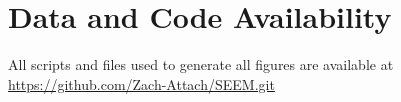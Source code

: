 \section{Data and Code Availability}

All scripts and files used to generate all figures are available at \url{https://github.com/Zach-Attach/SEEM.git}